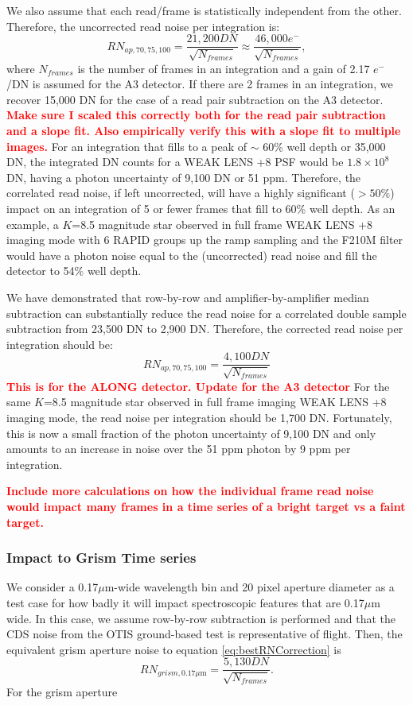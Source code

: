 \documentclass{aastex62}
\begin{document}
We also assume that each read/frame is statistically independent from the other.
Therefore, the uncorrected read noise per integration is:
\begin{equation}
RN_{ap,70,75,100} = \frac{21,200 DN}{ \sqrt{N_{frames}}} \approx \frac{46,000 e^-}{ \sqrt{N_{frames}}},
\end{equation}
where $N_{frames}$ is the number of frames in an integration and a gain of 2.17 $e^-$/DN is assumed for the A3 detector.
If there are 2 frames in an integration, we recover 15,000 DN for the case of a read pair subtraction on the A3 detector.
\textcolor{red}{\bf Make sure I scaled this correctly both for the read pair subtraction and a slope fit. Also empirically verify this with a slope fit to multiple images.}
For an integration that fills to a peak of $\sim$ 60\% well depth or 35,000 DN, the integrated DN counts for a WEAK LENS +8 PSF would be $1.8 \times10^8$ DN, having a photon uncertainty of 9,100 DN or 51 ppm.
Therefore, the correlated read noise, if left uncorrected, will have a highly significant ($>50\%$) impact on an integration of 5 or fewer frames that fill to 60\% well depth.
As an example, a $K$=8.5 magnitude star observed in full frame WEAK LENS +8 imaging mode with 6 RAPID groups up the ramp sampling and the F210M filter would have a photon noise equal to the (uncorrected) read noise and fill the detector to 54\% well depth.

We have demonstrated that row-by-row and amplifier-by-amplifier median subtraction can substantially reduce the read noise for a correlated double sample subtraction from 23,500 DN to 2,900 DN.
Therefore, the corrected read noise per integration should be:
\begin{equation}\label{eq:bestRNCorrection}
RN_{ap,70,75,100} = \frac{4,100 DN}{ \sqrt{N_{frames}}}
\end{equation}
\textcolor{red}{\bf This is for the ALONG detector.
Update for the A3 detector}
For the same $K$=8.5 magnitude star observed in full frame imaging WEAK LENS +8 imaging mode, the read noise per integration should be 1,700 DN.
Fortunately, this is now a small fraction of the photon uncertainty of 9,100 DN and only amounts to an increase in noise over the 51 ppm photon by 9 ppm per integration.


\textcolor{red}{\bf Include more calculations on how the individual frame read noise would impact many frames in a time series of a bright target vs a faint target.}

\subsubsection{Impact to Grism Time series}
We consider a 0.17$\mu$m-wide wavelength bin and 20 pixel aperture diameter as a test case for how badly it will impact spectroscopic features that are 0.17$\mu$m wide.
In this case, we assume row-by-row subtraction is performed and that the CDS noise from the OTIS ground-based test is representative of flight.
Then, the equivalent grism aperture noise to equation \ref{eq:bestRNCorrection} is
\begin{equation}
RN_{grism,0.17\mu\mathrm{m}} = \frac{5,130 DN}{ \sqrt{N_{frames}}}.
\end{equation}
For the grism aperture
\end{document}
